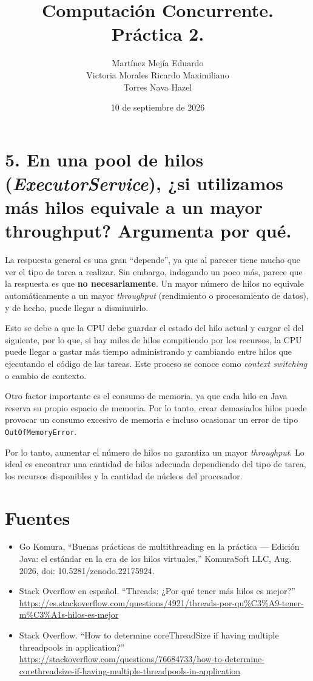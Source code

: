 \documentclass[12pt]{article}
\title{Computación Concurrente. Práctica 2.}
\author{
    Martínez Mejía Eduardo \\
    Victoria Morales Ricardo Maximiliano \\
    Torres Nava Hazel
}
\date{10 de septiembre de 2026}
\begin{document}
\maketitle

\vspace{0.5cm}


\section*{5. En una pool de hilos (\textit{ExecutorService}), ¿si utilizamos más hilos equivale a un mayor throughput? Argumenta por qué.}

La respuesta general es una gran ``depende'', ya que al parecer tiene mucho que ver el tipo de tarea a realizar. Sin embargo, indagando un poco más, parece que la respuesta es que \textbf{no necesariamente}. Un mayor número de hilos no equivale automáticamente a un mayor \textit{throughput} (rendimiento o procesamiento de datos), y de hecho, puede llegar a disminuirlo.

Esto se debe a que la CPU debe guardar el estado del hilo actual y cargar el del siguiente, por lo que, si hay miles de hilos compitiendo por los recursos, la CPU puede llegar a gastar más tiempo administrando y cambiando entre hilos que ejecutando el código de las tareas. Este proceso se conoce como \textit{context switching} o cambio de contexto.

Otro factor importante es el consumo de memoria, ya que cada hilo en Java reserva su propio espacio de memoria. Por lo tanto, crear demasiados hilos puede provocar un consumo excesivo de memoria e incluso ocasionar un error de tipo \texttt{OutOfMemoryError}.

Por lo tanto, aumentar el número de hilos no garantiza un mayor \textit{throughput}. Lo ideal es encontrar una cantidad de hilos adecuada dependiendo del tipo de tarea, los recursos disponibles y la cantidad de núcleos del procesador.

\vspace{0.5cm}

\section*{Fuentes}

\begin{itemize}
    \item Go Komura, ``Buenas prácticas de multithreading en la práctica --- Edición Java: el estándar en la era de los hilos virtuales,'' KomuraSoft LLC, Aug. 2026, doi: 10.5281/zenodo.22175924.

    \item Stack Overflow en español. ``Threads: ¿Por qué tener más hilos es mejor?'' 
    \url{https://es.stackoverflow.com/questions/4921/threads-por-qu%C3%A9-tener-m%C3%A1s-hilos-es-mejor}

    \item Stack Overflow. ``How to determine coreThreadSize if having multiple threadpools in application?''
    \url{https://stackoverflow.com/questions/76684733/how-to-determine-corethreadsize-if-having-multiple-threadpools-in-application}
\end{itemize}
\end{document}
